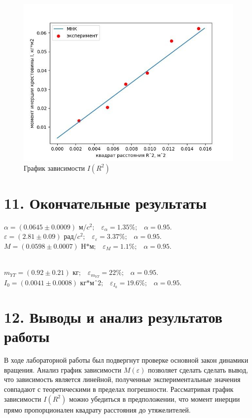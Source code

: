 \documentclass[14pt]{extreport}
\begin{document}
\begin{figure}[H]
	\begin{center}
		\includegraphics[scale=0.55]{I_R_2.jpg}
		\caption{График зависимости $I(R^2)$}
		\label{pic}
	\end{center}
\end{figure}

\section*{11. Окончательные результаты}

\begin{center}
    $\alpha = (0.0645 \pm 0.0009)\text{ м/$c^2$;}\quad \varepsilon_{\alpha} = 1.35\%\text{;} \quad \alpha = 0.95\text{.}$ \\
    $\varepsilon = (2.81 \pm 0.09)\text{ рад/$c^2$;}\quad \varepsilon_{\varepsilon} = 3.37\%\text{;} \quad \alpha = 0.95\text{.}$ \\
    $M = (0.0598 \pm 0.0007)\text{ Н*м;}\quad \varepsilon_{M} = 1.1\%\text{;} \quad \alpha = 0.95\text{.}$\\\
    
    $m_{YT} = (0.92 \pm 0.21)\text{ кг;}\quad \varepsilon_{m_{YT}} = 22\%\text{;} \quad \alpha = 0.95\text{.}$
    $I_0 = (0.0041 \pm 0.0008)\text{ кг*мˆ2;}\quad \varepsilon_{I_0} = 19.6\%\text{;} \quad \alpha = 0.95\text{.}$
\end{center}

\section*{12. Выводы и анализ результатов работы}

В ходе лабораторной работы был подвергнут проверке основной закон динамики вращения. Анализ график зависимости $M(\varepsilon)$ позволяет сделать сделать вывод, что зависимость является линейной, полученные экспериментальные значения совпадают с теоретическими в пределах погрешности. Рассматривая график зависимости $I(R^2)$ можно убедиться в предположении, что момент инерции прямо пропорционален квадрату расстояния до утяжелителей.
\end{document}

